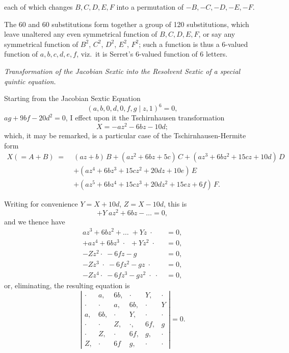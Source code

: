 \documentclass[11pt]{article}
\begin{document}
\medskip\noindent
each of which changes $B,C,D,E,F$ into a permutation of
$-B,-C,-D,-E,-F$.

\newpage
\noindent
The 60 and 60 substitutions form together a group of 120
substitutions, which leave unaltered any even symmetrical function
of $B,C,D,E,F$, or say any symmetrical function of $B^{2}$,
$C^{2}$, $D^{2}$, $E^{2}$, $F^{2}$; such a function is thus a
6-valued function of $a,b,c,d,e,f$, viz.\ it is Serret's 6-valued
function of 6 letters.

\bigskip

\begin{center}
\textit{Transformation of the Jacobian Sextic into the Resolvent
Sextic of a special quintic equation.}
\end{center}

\medskip\noindent
Starting from the Jacobian Sextic Equation
\[
  (a,b,0,d,0,f,g\mid z,1)^{6}=0,
\]
$ag+9bf-20d^{2}=0$, I effect upon it the Tschirnhausen
transformation
\[
  X=-az^{2}-6bz-10d;
\]
which, it may be remarked, is a particular case of the
Tschirnhausen-Hermite form
\begin{align*}
  X(=A+B)\;=\;& (az+b)\,B+(az^{2}+6bz+5c)\,C+(az^{3}+6bz^{2}+15cz+10d)\,D\\
  & +(az^{4}+6bz^{3}+15cz^{2}+20dz+10e)\,E\\
  & +(az^{5}+6bz^{4}+15cz^{3}+20dz^{2}+15ez+6f)\,F.
\end{align*}

\medskip
Writing for convenience $Y=X+10d$, $Z=X-10d$, this is
\[
  +Y\;az^{2}+6bz-\ldots=0,
\]
and we thence have
\begin{align*}
  az^{3}+6bz^{2}+\ldots\;+Yz\;\cdot\;&=0,\\
  +az^{4}+6bz^{3}\;\cdot\;\;+Yz^{2}\;\cdot\;&=0,\\
  -Zz^{2}\cdot\;-6fz-g&=0,\\
  -Zz^{3}\;\cdot\;-6fz^{2}-gz\;\cdot\;&=0,\\
  -Zz^{4}\cdot\;-6fz^{3}-gz^{2}\;\cdot\;\cdot\;&=0,
\end{align*}
or, eliminating, the resulting equation is
\[
  \left|\begin{array}{cccccc}
  \cdot & a, & 6b, & \cdot & Y, & \cdot\\
  \cdot & \cdot & a, & 6b, & \cdot & Y\\
  a, & 6b, & \cdot & Y, & \cdot & \cdot\\
  \cdot & \cdot & Z, & \cdot, & 6f, & g\\
  \cdot & Z, & \cdot & 6f, & g, & \cdot\\
  Z, & \cdot & 6f & g, & \cdot & \cdot
  \end{array}\right|=0.
\]
\end{document}
